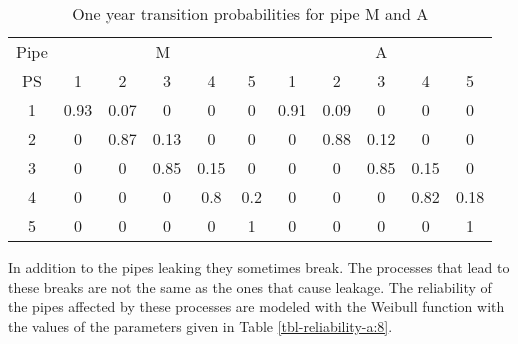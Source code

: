 \begin{table}[h]
\caption{One year transition probabilities for pipe M and A}
\label{tbl-reliability-a:7}
{
\begin{tabular}{|l|l|l|l|l|l|l|l|l|l|l|}
\hline
\multicolumn{1}{|c|}{Pipe} & \multicolumn{5}{c|}{M} & \multicolumn{5}{c|}{A} \\ 
\cline{2-11}
\multicolumn{1}{|c|}{PS} & \multicolumn{1}{c|}{1} & \multicolumn{1}{c|}{2} & \multicolumn{1}{c|}{3} & \multicolumn{1}{c|}{4} & \multicolumn{1}{c|}{5} & \multicolumn{1}{c|}{1} & \multicolumn{1}{c|}{2} & \multicolumn{1}{c|}{3} & \multicolumn{1}{c|}{4} & \multicolumn{1}{c|}{5} \\ 
\hline
\multicolumn{1}{|c|}{1} & \multicolumn{1}{c|}{0.93} & \multicolumn{1}{c|}{0.07} & \multicolumn{1}{c|}{0} & \multicolumn{1}{c|}{0} & \multicolumn{1}{c|}{0} & \multicolumn{1}{c|}{0.91} & \multicolumn{1}{c|}{0.09} & \multicolumn{1}{c|}{0} & \multicolumn{1}{c|}{0} & \multicolumn{1}{c|}{0} \\ 
\hline
\multicolumn{1}{|c|}{2} & \multicolumn{1}{c|}{0} & \multicolumn{1}{c|}{0.87} & \multicolumn{1}{c|}{0.13} & \multicolumn{1}{c|}{0} & \multicolumn{1}{c|}{0} & \multicolumn{1}{c|}{0} & \multicolumn{1}{c|}{0.88} & \multicolumn{1}{c|}{0.12} & \multicolumn{1}{c|}{0} & \multicolumn{1}{c|}{0} \\ 
\hline
\multicolumn{1}{|c|}{3} & \multicolumn{1}{c|}{0} & \multicolumn{1}{c|}{0} & \multicolumn{1}{c|}{0.85} & \multicolumn{1}{c|}{0.15} & \multicolumn{1}{c|}{0} & \multicolumn{1}{c|}{0} & \multicolumn{1}{c|}{0} & \multicolumn{1}{c|}{0.85} & \multicolumn{1}{c|}{0.15} & \multicolumn{1}{c|}{0} \\ 
\hline
\multicolumn{1}{|c|}{4} & \multicolumn{1}{c|}{0} & \multicolumn{1}{c|}{0} & \multicolumn{1}{c|}{0} & \multicolumn{1}{c|}{0.8} & \multicolumn{1}{c|}{0.2} & \multicolumn{1}{c|}{0} & \multicolumn{1}{c|}{0} & \multicolumn{1}{c|}{0} & \multicolumn{1}{c|}{0.82} & \multicolumn{1}{c|}{0.18} \\ 
\hline
\multicolumn{1}{|c|}{5} & \multicolumn{1}{c|}{0} & \multicolumn{1}{c|}{0} & \multicolumn{1}{c|}{0} & \multicolumn{1}{c|}{0} & \multicolumn{1}{c|}{1} & \multicolumn{1}{c|}{0} & \multicolumn{1}{c|}{0} & \multicolumn{1}{c|}{0} & \multicolumn{1}{c|}{0} & \multicolumn{1}{c|}{1} \\ 
\hline
\end{tabular}
}
\end{table}

In addition to the pipes leaking they sometimes break. The processes that lead
to these breaks are not the same as the ones that cause leakage. The reliability
of the pipes affected by these processes are modeled with the Weibull function
 with the values of the parameters given in Table \ref{tbl-reliability-a:8}.


